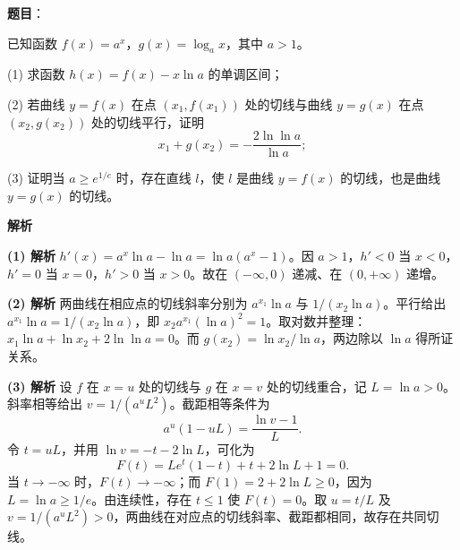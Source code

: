 \begin{answer}

\textbf{题目}：

已知函数 $f(x)=a^x$，$g(x)=\log_a x$，其中 $a>1$。

(1) 求函数 $h(x)=f(x)-x\ln a$ 的单调区间；

(2) 若曲线 $y=f(x)$ 在点 $(x_1,f(x_1))$ 处的切线与曲线 $y=g(x)$ 在点 $(x_2,g(x_2))$ 处的切线平行，证明
\nopagebreak[4]
\[
x_1+g(x_2)=-\frac{2\ln\ln a}{\ln a};
\]

(3) 证明当 $a\geqslant e^{1/e}$ 时，存在直线 $l$，使 $l$ 是曲线 $y=f(x)$ 的切线，也是曲线 $y=g(x)$ 的切线。

\textbf{解析}

\textbf{(1) 解析} $h'(x)=a^x\ln a-\ln a=\ln a(a^x-1)$。因 $a>1$，$h'<0$ 当 $x<0$，$h'=0$ 当 $x=0$，$h'>0$ 当 $x>0$。故在 $(-\infty,0)$ 递减、在 $(0,+\infty)$ 递增。

\textbf{(2) 解析} 两曲线在相应点的切线斜率分别为 $a^{x_1}\ln a$ 与 $1/(x_2\ln a)$。平行给出 $a^{x_1}\ln a=1/(x_2\ln a)$，即 $x_2a^{x_1}(\ln a)^2=1$。取对数并整理：$x_1\ln a+\ln x_2+2\ln\ln a=0$。而 $g(x_2)=\ln x_2/\ln a$，两边除以 $\ln a$ 得所证关系。

\textbf{(3) 解析} 设 $f$ 在 $x=u$ 处的切线与 $g$ 在 $x=v$ 处的切线重合，记 $L=\ln a>0$。斜率相等给出 $v=1/(a^uL^2)$。截距相等条件为
\nopagebreak[4]
\[a^u(1-uL)=\frac{\ln v-1}{L}.\]
令 $t=uL$，并用 $\ln v=-t-2\ln L$，可化为
\nopagebreak[4]
\[F(t)=Le^t(1-t)+t+2\ln L+1=0.\]
当 $t\to-\infty$ 时，$F(t)\to-\infty$；而 $F(1)=2+2\ln L\ge0$，因为 $L=\ln a\ge1/e$。由连续性，存在 $t\le1$ 使 $F(t)=0$。取 $u=t/L$ 及 $v=1/(a^uL^2)>0$，两曲线在对应点的切线斜率、截距都相同，故存在共同切线。




\end{answer}